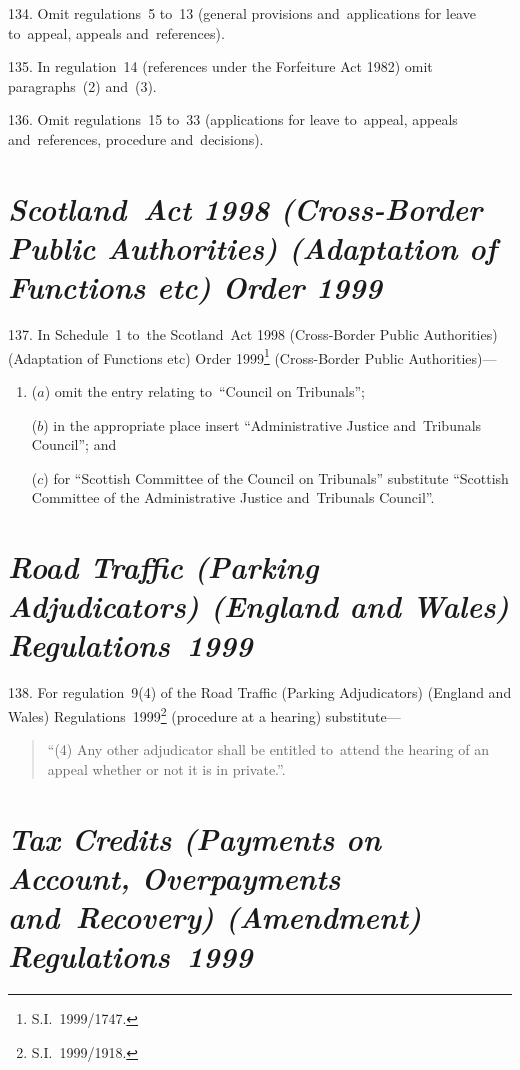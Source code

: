 \documentclass[12pt,a4paper]{article}
\begin{document}
\medskip

134.  Omit regulations~5 to~13 (general provisions and~applications for leave to~appeal, appeals and~references).

\medskip

135.  In regulation~14 (references under the Forfeiture Act 1982) omit paragraphs~(2) and~(3).

\medskip

136.  Omit regulations~15 to~33 (applications for leave to~appeal, appeals and~references, procedure and~decisions).

\section*{\itshape Scotland~Act 1998 (Cross-Border Public Authorities) (Adaptation of Functions etc) Order 1999}

137.  In Schedule~1 to~the Scotland~Act 1998 (Cross-Border Public Authorities) (Adaptation of Functions etc) Order 1999\footnote{S.I.~1999/1747.} (Cross-Border Public Authorities)—
\begin{enumerate}\item[]
($a$) omit the entry relating to~“Council on Tribunals”;

($b$) in the appropriate place insert “Administrative Justice and~Tribunals Council”; and

($c$) for “Scottish Committee of the Council on Tribunals” substitute “Scottish Committee of the Administrative Justice and~Tribunals Council”.
\end{enumerate}

\section*{\itshape\sloppy Road Traffic (Parking Adjudicators) (England and Wales) Regulations~1999}

138.  For regulation~9(4) of the Road Traffic (Parking Adjudicators) (England and Wales) Regulations~1999\footnote{S.I.~1999/1918.} (procedure at a hearing) substitute—
\begin{quotation}
“(4) Any other adjudicator shall be entitled to~attend the hearing of an appeal whether or not it is in private.”.
\end{quotation}

\section*{\itshape Tax Credits (Payments on Account, Overpayments and~Recovery) (Amendment) Regulations~1999}
\end{document}
